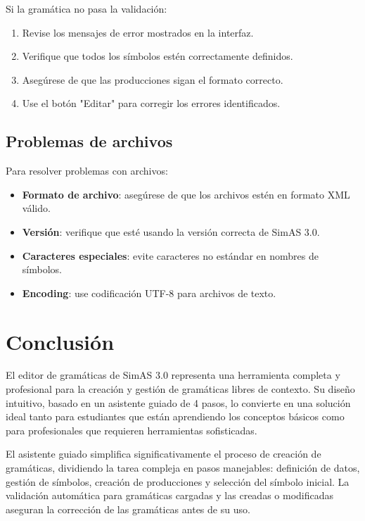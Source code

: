 Si la gramática no pasa la validación:

\begin{enumerate}
    \item Revise los mensajes de error mostrados en la interfaz.
    \item Verifique que todos los símbolos estén correctamente definidos.
    \item Asegúrese de que las producciones sigan el formato correcto.
    \item Use el botón \string"Editar\string" para corregir los errores identificados.
\end{enumerate}

\subsection{Problemas de archivos}

Para resolver problemas con archivos:

\begin{itemize}
    \item \textbf{Formato de archivo}: asegúrese de que los archivos estén en formato XML válido.
    \item \textbf{Versión}: verifique que esté usando la versión correcta de SimAS 3.0.
    \item \textbf{Caracteres especiales}: evite caracteres no estándar en nombres de símbolos.
    \item \textbf{Encoding}: use codificación UTF-8 para archivos de texto.
\end{itemize}

\section{Conclusión}

El editor de gramáticas de SimAS 3.0 representa una herramienta completa y profesional para la creación y gestión de gramáticas libres de contexto. Su diseño intuitivo, basado en un asistente guiado de 4 pasos, lo convierte en una solución ideal tanto para estudiantes que están aprendiendo los conceptos básicos como para profesionales que requieren herramientas sofisticadas.

El asistente guiado simplifica significativamente el proceso de creación de gramáticas, dividiendo la tarea compleja en pasos manejables: definición de datos, gestión de símbolos, creación de producciones y selección del símbolo inicial. La validación automática para gramáticas cargadas y las creadas o modificadas aseguran la corrección de las gramáticas antes de su uso.

